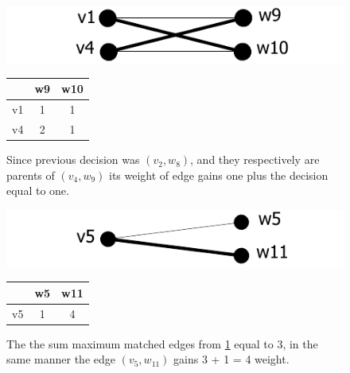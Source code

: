 \documentclass{report}
\begin{document}
\begin{figure}[h]
  \begin{minipage}[h]{0.60\linewidth}
    \centering
    \includegraphics[scale=0.95]{Figures/algorithms/TD/5ex.pdf}\\[0.1cm]
    
  \end{minipage}%
  \begin{minipage}[b]{0.30\linewidth}
    \centering
\begin{tabular}{|c|c|c|}
\hline
   & w9 & w10 \\ \hline
v1 & 1  & \cellcolor[gray]{0.9} 1   \\ \hline
v4 &  \cellcolor[gray]{0.9}2  & 1   \\ \hline
\end{tabular}
\end{minipage}
\caption[]{Since previous decision was $(v_{2},w_{8})$, and they respectively are parents of $(v_{4},w_{9})$ its weight of edge gains one plus the decision equal to one.}
\label{fig:ex5}
\end{figure}

\begin{figure}[h]
  \begin{minipage}[h]{0.60\linewidth}
    \centering
    \includegraphics[scale=0.95]{Figures/algorithms/TD/4ex.pdf}\\[0.1cm]
    
  \end{minipage}%
  \begin{minipage}[b]{0.30\linewidth}
    \centering
\begin{tabular}{|c|c|c|}
\hline
   & w5 & w11 \\ \hline
v5 & 1  &  \cellcolor[gray]{0.9} 4   \\ \hline
\end{tabular}
\end{minipage}
\caption[]{The the sum maximum matched edges from \ref{fig:ex5} equal to 3, in the same manner the edge $(v_{5},w_{11})$ gains 3 + 1 = 4 weight.}
\label{fig:ex4}
\end{figure}
\end{document}
